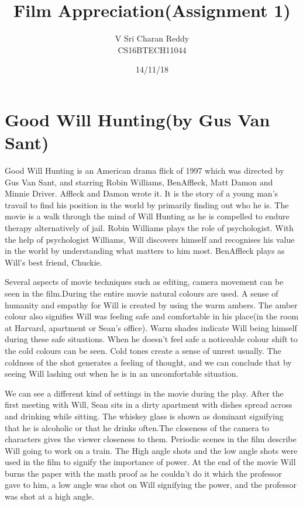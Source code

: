 \documentclass[10pt]{article}
\title{Film Appreciation(Assignment 1)}
\author{V Sri Charan Reddy\\CS16BTECH11044}
\date{14/11/18}
\begin{document}
	\onehalfspacing
\maketitle
\section{Good Will Hunting(by Gus Van Sant)}
\par
Good Will Hunting is an American drama flick of 1997 which was directed by Gus Van Sant, and starring Robin Williams, BenAffleck, Matt Damon and  Minnie Driver. Affleck and Damon wrote it. It is the story of a young man's travail to find his position in the world by primarily finding out who he is. The movie is a walk through the mind of Will Hunting as he is compelled to endure therapy alternatively of jail. Robin Williams plays the role of psychologist. With the help of psychologist Williams, Will discovers himself and recognises his value in the world by understanding what matters to him most. BenAffleck plays as Will's best friend, Chuckie.
\\
\par
 Several aspects of movie techniques such as editing, camera movement can be seen in the film.During the entire movie natural colours are used. A sense of humanity and empathy for Will is created by using the warm ambers. The amber colour also signifies Will was feeling safe and comfortable in his place(in the room at Harvard, apartment or Sean's office). Warm shades indicate Will being himself during these safe situations. When he doesn't feel safe a noticeable colour shift to the cold colours can be seen. Cold tones create a sense of unrest usually. The coldness of the shot generates a feeling of thought, and we can conclude that by seeing Will lashing out when he is in an uncomfortable situation.\\
 \par
We can see a different kind of settings in the movie during the play. After the first meeting with Will, Sean sits in a dirty apartment with dishes spread across and drinking while sitting. The whiskey glass is shown as dominant signifying that he is alcoholic or that he drinks often.The closeness of the camera to characters gives the viewer closeness to them. Periodic scenes in the film describe Will going to work on a train. The High angle shots and the low angle shots were used in the film to signify the importance of power. At the end of the movie Will burns the paper with the math proof as he couldn't do it which the professor gave to him, a low angle was shot on Will signifying the power, and the professor was shot at a high angle. \\
\end{document}
